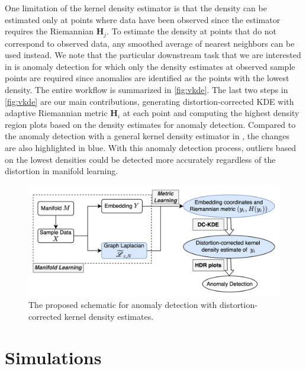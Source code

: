 \documentclass[11pt,a4paper,]{article}
\begin{document}
One limitation of the kernel density estimator is that the density can be estimated only at points where data have been observed since the estimator requires the Riemannian \(\pmb{H}_j\). To estimate the density at points that do not correspond to observed data, any smoothed average of nearest neighbors can be used instead. We note that the particular downstream task that we are interested in is anomaly detection for which only the density estimates at observed sample points are required since anomalies are identified as the points with the lowest density. The entire workflow is summarized in \autoref{fig:vkde}. The last two steps in \autoref{fig:vkde} are our main contributions, generating distortion-corrected KDE with adaptive Riemannian metric \(\pmb{H}_i\) at each point and computing the highest density region plots based on the density estimates for anomaly detection. Compared to the anomaly detection with a general kernel density estimator in \textcite{Cheng2021-dh}, the changes are also highlighted in blue. With this anomaly detection process, outliers based on the lowest densities could be detected more accurately regardless of the distortion in manifold learning.



\begin{figure}

{\centering \includegraphics[width=0.95\linewidth]{figures/DC-KDE} 

}

\caption{The proposed schematic for anomaly detection with distortion-corrected kernel density estimates.}\label{fig:vkde}
\end{figure}

\hypertarget{simulation}{%
\section{Simulations}\label{simulation}}
\end{document}
